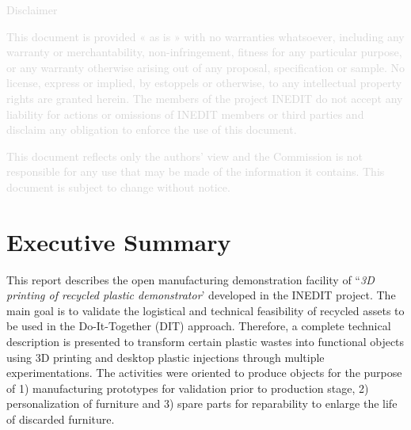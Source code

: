 \documentclass[
  11pt,
]{article}
\renewcommand*\contentsname{Table of contents}
\newcommand\contentsname{Table of contents}
\begin{document}
\vfill

\begin{center}
\textcolor{lightgray}{Disclaimer}

\textcolor{lightgray}{
\small
This document is provided « as is » with no warranties whatsoever, including any warranty or merchantability, non-infringement, fitness for any particular purpose, or any warranty otherwise arising out of any proposal, specification or sample.  No license, express or implied, by estoppels or otherwise, to any intellectual property rights are granted herein. The members of the project INEDIT do not accept any liability for actions or omissions of INEDIT members or third parties and disclaim any obligation to enforce the use of this document. }

\textcolor{lightgray}{
This document reflects only the authors' view and the Commission is not responsible for any use that may be made of the information it contains.  This document is subject to change without notice. 
}
\end{center}
\normalsize

\newpage

\ifdefined\Shaded\renewenvironment{Shaded}{\begin{tcolorbox}[frame hidden, boxrule=0pt, enhanced, interior hidden, breakable, borderline west={3pt}{0pt}{shadecolor}, sharp corners]}{\end{tcolorbox}}\fi

\renewcommand*\contentsname{Table of contents}
{
\hypersetup{linkcolor=}
\setcounter{tocdepth}{3}
\tableofcontents
}
\newpage

\bgroup
\hypersetup{linkcolor = black}
\listoffigures
\egroup

\color{darkgray}

\newpage

\hypertarget{executive-summary}{%
\section{Executive Summary}\label{executive-summary}}

This report describes the open manufacturing demonstration facility of
``\emph{3D printing of recycled plastic demonstrator}' developed in the
INEDIT project. The main goal is to validate the logistical and
technical feasibility of recycled assets to be used in the
Do-It-Together (DIT) approach. Therefore, a complete technical
description is presented to transform certain plastic wastes into
functional objects using 3D printing and desktop plastic injections
through multiple experimentations. The activities were oriented to
produce objects for the purpose of 1) manufacturing prototypes for
validation prior to production stage, 2) personalization of furniture
and 3) spare parts for reparability to enlarge the life of discarded
furniture.
\end{document}
